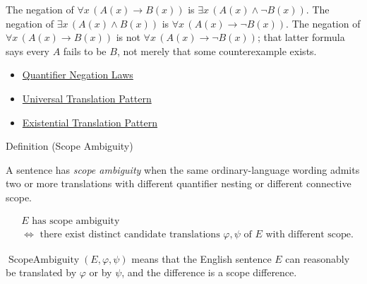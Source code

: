 \begin{remark*}[Exposition]
The negation of \(\forall x\,(A(x)\to B(x))\) is
\(\exists x\,(A(x)\land \neg B(x))\). The negation of
\(\exists x\,(A(x)\land B(x))\) is \(\forall x\,(A(x)\to \neg B(x))\). The
negation of \(\forall x\,(A(x)\to B(x))\) is not
\(\forall x\,(A(x)\to \neg B(x))\); that latter formula says every \(A\) fails
to be \(B\), not merely that some counterexample exists.
\end{remark*}

\begin{dependencies}
\begin{itemize}
  \item \hyperref[thm:qneg]{Quantifier Negation Laws}
  \item \hyperref[prop:universal-translation-pattern]{Universal Translation Pattern}
  \item \hyperref[prop:existential-translation-pattern]{Existential Translation Pattern}
\end{itemize}
\end{dependencies}

\begin{definitionbox}{Definition (Scope Ambiguity)}
\begin{definition}
\label{def:scope-ambiguity-translation}
A sentence has \emph{scope ambiguity} when the same ordinary-language wording
admits two or more translations with different quantifier nesting or different
connective scope.
\end{definition}
\end{definitionbox}

\begin{remark*}
\[
\begin{aligned}
&E \text{ has scope ambiguity}\\
&\Longleftrightarrow
\text{ there exist distinct candidate translations }\varphi,\psi
\text{ of }E\text{ with different scope.}
\end{aligned}
\]
\end{remark*}

\begin{remark*}
\(\operatorname{ScopeAmbiguity}(E,\varphi,\psi)\) means that the English
sentence \(E\) can reasonably be translated by \(\varphi\) or by \(\psi\), and
the difference is a scope difference.
\end{remark*}

